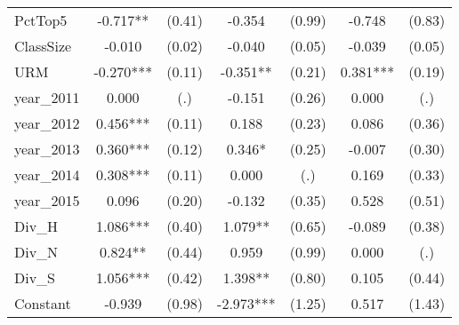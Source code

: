 \begin{sidewaystable}[htb]
\begin{threeparttable}
\begin{tabular}{l|c|c|c|c|c|c}
      PctTop5           & -0.717**                     & (0.41)                       & -0.354               & (0.99)               & -0.748               & (0.83)               \\
      ClassSize         & -0.010                       & (0.02)                       & -0.040               & (0.05)               & -0.039               & (0.05)               \\
      URM               & -0.270***                    & (0.11)                       & -0.351**             & (0.21)               & 0.381***             & (0.19)               \\
      year\_2011        & 0.000                        & (.)                          & -0.151               & (0.26)               & 0.000                & (.)                  \\
      year\_2012        & 0.456***                     & (0.11)                       & 0.188                & (0.23)               & 0.086                & (0.36)               \\
      year\_2013        & 0.360***                     & (0.12)                       & 0.346*               & (0.25)               & -0.007               & (0.30)               \\
      year\_2014        & 0.308***                     & (0.11)                       & 0.000                & (.)                  & 0.169                & (0.33)               \\
      year\_2015        & 0.096                        & (0.20)                       & -0.132               & (0.35)               & 0.528                & (0.51)               \\
      Div\_H            & 1.086***                     & (0.40)                       & 1.079**              & (0.65)               & -0.089               & (0.38)               \\
      Div\_N            & 0.824**                      & (0.44)                       & 0.959                & (0.99)               & 0.000                & (.)                  \\
      Div\_S            & 1.056***                     & (0.42)                       & 1.398**              & (0.80)               & 0.105                & (0.44)               \\
      Constant          & -0.939                       & (0.98)                       & -2.973***            & (1.25)               & 0.517                & (1.43)               \\

\end{tabular}
\end{threeparttable}
\end{sidewaystable}
